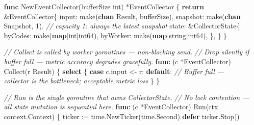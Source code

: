 \documentclass[
]{article}
\newenvironment{Shaded}{}{}
\newcommand{\BuiltInTok}[1]{\textcolor[rgb]{0.00,0.50,0.00}{#1}}
\newcommand{\CommentTok}[1]{\textcolor[rgb]{0.38,0.63,0.69}{\textit{#1}}}
\newcommand{\ControlFlowTok}[1]{\textcolor[rgb]{0.00,0.44,0.13}{\textbf{#1}}}
\newcommand{\DataTypeTok}[1]{\textcolor[rgb]{0.56,0.13,0.00}{#1}}
\newcommand{\DecValTok}[1]{\textcolor[rgb]{0.25,0.63,0.44}{#1}}
\newcommand{\KeywordTok}[1]{\textcolor[rgb]{0.00,0.44,0.13}{\textbf{#1}}}
\newcommand{\NormalTok}[1]{#1}
\newcommand{\OperatorTok}[1]{\textcolor[rgb]{0.40,0.40,0.40}{#1}}
\begin{document}
\begin{Shaded}
\begin{Highlighting}[]
\KeywordTok{func}\NormalTok{ NewEventCollector}\OperatorTok{(}\NormalTok{bufferSize }\DataTypeTok{int}\OperatorTok{)} \OperatorTok{*}\NormalTok{EventCollector }\OperatorTok{\{}
    \ControlFlowTok{return} \OperatorTok{\&}\NormalTok{EventCollector}\OperatorTok{\{}
\NormalTok{        input}\OperatorTok{:}    \BuiltInTok{make}\OperatorTok{(}\KeywordTok{chan}\NormalTok{ Result}\OperatorTok{,}\NormalTok{ bufferSize}\OperatorTok{),}
\NormalTok{        snapshot}\OperatorTok{:} \BuiltInTok{make}\OperatorTok{(}\KeywordTok{chan}\NormalTok{ Snapshot}\OperatorTok{,} \DecValTok{1}\OperatorTok{),} \CommentTok{// capacity 1: always the latest snapshot}
\NormalTok{        state}\OperatorTok{:} \OperatorTok{\&}\NormalTok{CollectorState}\OperatorTok{\{}
\NormalTok{            byCodes}\OperatorTok{:}  \BuiltInTok{make}\OperatorTok{(}\KeywordTok{map}\OperatorTok{[}\DataTypeTok{int}\OperatorTok{]}\DataTypeTok{int64}\OperatorTok{),}
\NormalTok{            byWorker}\OperatorTok{:} \BuiltInTok{make}\OperatorTok{(}\KeywordTok{map}\OperatorTok{[}\DataTypeTok{string}\OperatorTok{]}\DataTypeTok{int64}\OperatorTok{),}
        \OperatorTok{\},}
    \OperatorTok{\}}
\OperatorTok{\}}

\CommentTok{// Collect is called by worker goroutines — non{-}blocking send.}
\CommentTok{// Drop silently if buffer full — metric accuracy degrades gracefully.}
\KeywordTok{func} \OperatorTok{(}\NormalTok{c }\OperatorTok{*}\NormalTok{EventCollector}\OperatorTok{)}\NormalTok{ Collect}\OperatorTok{(}\NormalTok{r Result}\OperatorTok{)} \OperatorTok{\{}
    \ControlFlowTok{select} \OperatorTok{\{}
    \ControlFlowTok{case}\NormalTok{ c}\OperatorTok{.}\NormalTok{input }\OperatorTok{\textless{}{-}}\NormalTok{ r}\OperatorTok{:}
    \ControlFlowTok{default}\OperatorTok{:}
        \CommentTok{// Buffer full — collector is the bottleneck; acceptable metric loss}
    \OperatorTok{\}}
\OperatorTok{\}}

\CommentTok{// Run is the single goroutine that owns CollectorState.}
\CommentTok{// No lock contention — all state mutation is sequential here.}
\KeywordTok{func} \OperatorTok{(}\NormalTok{c }\OperatorTok{*}\NormalTok{EventCollector}\OperatorTok{)}\NormalTok{ Run}\OperatorTok{(}\NormalTok{ctx context}\OperatorTok{.}\NormalTok{Context}\OperatorTok{)} \OperatorTok{\{}
\NormalTok{    ticker }\OperatorTok{:=}\NormalTok{ time}\OperatorTok{.}\NormalTok{NewTicker}\OperatorTok{(}\NormalTok{time}\OperatorTok{.}\NormalTok{Second}\OperatorTok{)}
    \ControlFlowTok{defer}\NormalTok{ ticker}\OperatorTok{.}\NormalTok{Stop}\OperatorTok{()}


\end{Highlighting}
\end{Shaded}
\end{document}
